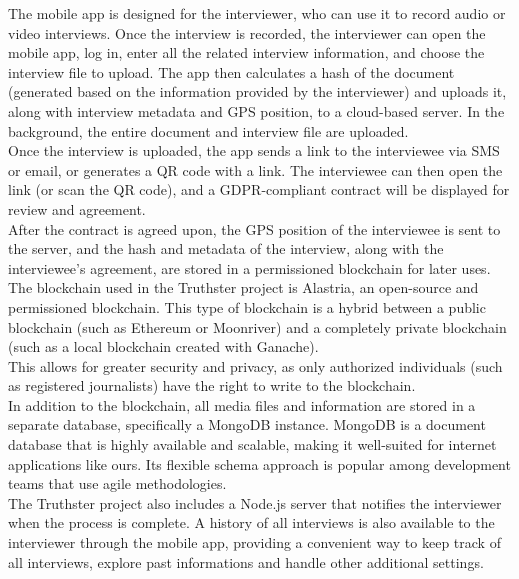\documentclass[target=mst,aauheader=]{thud}
\begin{document}
The mobile app is designed for the interviewer, who can use it to record audio or video interviews. Once the interview is recorded, the interviewer can open the mobile app, log in, enter all the related interview information, and choose the interview file to upload. The app then calculates a hash of the document (generated based on the information provided by the interviewer) and uploads it, along with interview metadata and GPS position, to a cloud-based server. In the background, the entire document and interview file are uploaded.\\

Once the interview is uploaded, the app sends a link to the interviewee via SMS or email, or generates a QR code with a link. The interviewee can then open the link (or scan the QR code), and a GDPR-compliant contract will be displayed for review and agreement.\\
After the contract is agreed upon, the GPS position of the interviewee is sent to the server, and the hash and metadata of the interview, along with the interviewee's agreement, are stored in a permissioned blockchain for later uses.\\

The blockchain used in the Truthster project is Alastria, an open-source and permissioned blockchain. This type of blockchain is a hybrid between a public blockchain (such as Ethereum or Moonriver) and a completely private blockchain (such as a local blockchain created with Ganache).\\
This allows for greater security and privacy, as only authorized individuals (such as registered journalists) have the right to write to the blockchain.\\

In addition to the blockchain, all media files and information are stored in a separate database, specifically a MongoDB instance. MongoDB is a document database that is highly available and scalable, making it well-suited for internet applications like ours. Its flexible schema approach is popular among development teams that use agile methodologies.\\

The Truthster project also includes a Node.js server that notifies the interviewer when the process is complete. A history of all interviews is also available to the interviewer through the mobile app, providing a convenient way to keep track of all interviews, explore past informations and handle other additional settings.\\
\end{document}
